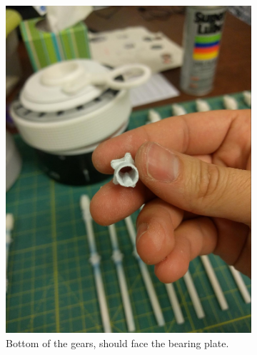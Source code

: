 \documentclass[openany]{book}
\begin{document}
\begin{figure}[!ht]
	\centering
	\begin{subfigure}{.46\textwidth}
		\centering
		\includegraphics[width=.95\textwidth]{images/image56.jpg}
		\caption{Bottom of the gears, should face the bearing plate.}
		\label{fig:image56}	
	\end{subfigure}
	\begin{subfigure}{.46\textwidth}
		\centering

\end{subfigure}
\end{figure}
\end{document}
